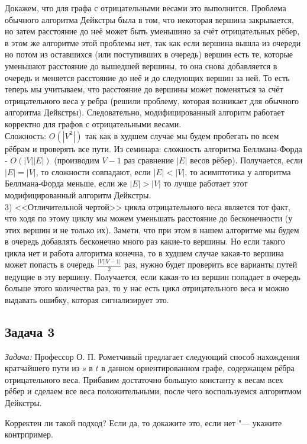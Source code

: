 \documentclass[a4paper,12pt]{article} %
\begin{document}
Докажем, что для графа с отрицательными весами это выполнится. Проблема обычного алгоритма Дейкстры была в том, что некоторая вершина закрывается, но затем расстояние до неё может быть уменьшино за счёт отрицательных рёбер, в этом же алгоритме этой проблемы нет, так как если вершина вышла из очереди но потом из оставшихся (или поступивших в очередь) вершин есть те, которые уменьшают расстояние до вышедшей вершины, то она снова добавляется в очередь и меняется расстояние до неё и до следующих вершин за ней. То есть теперь мы учитываем, что расстояние до вершины может поменяться за счёт отрицательного веса у ребра (решили проблему, которая возникает для обычного алгоритма Дейкстры). Следовательно, модифицированный алгоритм работает корректно для графов с отрицательными весами.\\
Сложность: $ O(|V^2|) $ так как в худшем случае мы будем пробегать по всем рёбрам и проверять все пути. Из семинара: сложность алгоритма Беллмана-Форда - $ O(|V||E|) $ (производим  $ V-1 $ раз сравнение $ |E| $ весов рёбер). Получается, если $ |E| = |V|$, то сложности совпадают, если $ |E| < |V|$, то асимптотика у алгоритма Беллмана-Форда меньше, если же $ |E| > |V|$ то лучше работает этот модифицированный алгоритм Дейкстры.\\

3) <<Отличительной чертой>> цикла отрицательного веса является тот факт, что ходя по этому циклу мы можем уменьшать расстояние до бесконечности (у этих вершин и не только их). Замети, что при этом в нашем алгоритме мы будем в очередь добавлять бесконечно много раз какие-то вершины. Но если такого цикла нет и работа алгоритма конечна, то в худшем случае какая-то вершина может попасть в очередь $ \frac{|V||V-1|}{2} $ раз, нужно будет проверить все варианты путей ведущие в эту вершину. Получается, если какая-то из вершин попадает в очередь больше этого количества раз, то у нас есть цикл отрицательного веса и можно выдавать ошибку, которая сигнализирует это.

\subsection*{Задача 3}
\textit{Задача:} Профессор О. П. Рометчивый предлагает следующий способ нахождения кратчайшего пути из $s$ в $t$ в данном ориентированном графе, содержащем рёбра отрицательного веса. Прибавим достаточно большую константу к весам всех рёбер и сделаем все веса положительными, после чего воспользуемся алгоритмом Дейкстры.

Корректен ли такой подход? Если да, то докажите это, если нет "--- укажите контрпример.\\
\end{document}
